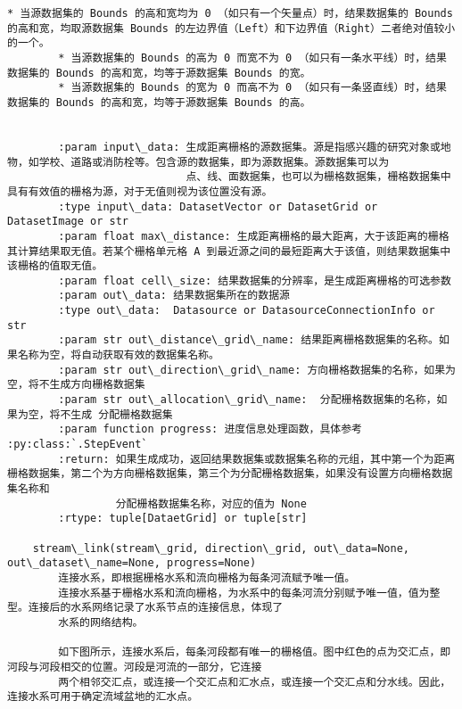 \documentclass[11pt]{article}
\begin{document}
\begin{Verbatim}[commandchars=\\\{\}]
        * 当源数据集的 Bounds 的高和宽均为 0 （如只有一个矢量点）时，结果数据集的 Bounds 的高和宽，均取源数据集 Bounds 的左边界值（Left）和下边界值（Right）二者绝对值较小的一个。
        * 当源数据集的 Bounds 的高为 0 而宽不为 0 （如只有一条水平线）时，结果数据集的 Bounds 的高和宽，均等于源数据集 Bounds 的宽。
        * 当源数据集的 Bounds 的宽为 0 而高不为 0 （如只有一条竖直线）时，结果数据集的 Bounds 的高和宽，均等于源数据集 Bounds 的高。
        
        
        :param input\_data: 生成距离栅格的源数据集。源是指感兴趣的研究对象或地物，如学校、道路或消防栓等。包含源的数据集，即为源数据集。源数据集可以为
                            点、线、面数据集，也可以为栅格数据集，栅格数据集中具有有效值的栅格为源，对于无值则视为该位置没有源。
        :type input\_data: DatasetVector or DatasetGrid or DatasetImage or str
        :param float max\_distance: 生成距离栅格的最大距离，大于该距离的栅格其计算结果取无值。若某个栅格单元格 A 到最近源之间的最短距离大于该值，则结果数据集中该栅格的值取无值。
        :param float cell\_size: 结果数据集的分辨率，是生成距离栅格的可选参数
        :param out\_data: 结果数据集所在的数据源
        :type out\_data:  Datasource or DatasourceConnectionInfo or str
        :param str out\_distance\_grid\_name: 结果距离栅格数据集的名称。如果名称为空，将自动获取有效的数据集名称。
        :param str out\_direction\_grid\_name: 方向栅格数据集的名称，如果为空，将不生成方向栅格数据集
        :param str out\_allocation\_grid\_name:  分配栅格数据集的名称，如果为空，将不生成 分配栅格数据集
        :param function progress: 进度信息处理函数，具体参考 :py:class:`.StepEvent`
        :return: 如果生成成功，返回结果数据集或数据集名称的元组，其中第一个为距离栅格数据集，第二个为方向栅格数据集，第三个为分配栅格数据集，如果没有设置方向栅格数据集名称和
                 分配栅格数据集名称，对应的值为 None
        :rtype: tuple[DataetGrid] or tuple[str]
    
    stream\_link(stream\_grid, direction\_grid, out\_data=None, out\_dataset\_name=None, progress=None)
        连接水系，即根据栅格水系和流向栅格为每条河流赋予唯一值。
        连接水系基于栅格水系和流向栅格，为水系中的每条河流分别赋予唯一值，值为整型。连接后的水系网络记录了水系节点的连接信息，体现了
        水系的网络结构。
        
        如下图所示，连接水系后，每条河段都有唯一的栅格值。图中红色的点为交汇点，即河段与河段相交的位置。河段是河流的一部分，它连接
        两个相邻交汇点，或连接一个交汇点和汇水点，或连接一个交汇点和分水线。因此，连接水系可用于确定流域盆地的汇水点。
        

\end{Verbatim}
\end{document}
